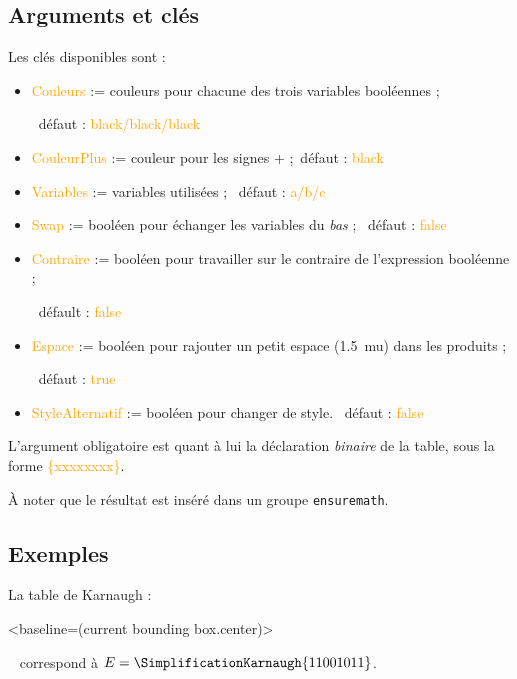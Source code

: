 \documentclass[french,a4paper,11pt]{article}
\newcommand\Cle[1]{{\small\sffamily\textlangle \textcolor{orange}{#1}\textrangle}}
\begin{document}
{{\pagebreak

\subsection{Arguments et clés }

\begin{DemoCode}
\end{DemoCode}

\begin{tipblock}
Les clés disponibles sont :

\begin{itemize}
	\item \Cle{Couleurs} := couleurs pour chacune des trois variables booléennes ;
	
	\hfill~défaut : \Cle{black/black/black}
	\item \Cle{CouleurPlus} := couleur pour les signes + ;\hfill~défaut : \Cle{black}
	\item \Cle{Variables} := variables utilisées ; \hfill~défaut : \Cle{a/b/c}
	\item \Cle{Swap} := booléen pour échanger les variables du \textit{bas} ; \hfill~défaut : \Cle{false}
	\item \Cle{Contraire} := booléen pour travailler sur le contraire de l'expression booléenne ;
	
	\hfill~défault : \Cle{false}
	\item \Cle{Espace} := booléen pour rajouter un petit espace (1.5~mu) dans les produits ;
	
	\hfill~défaut : \Cle{true}
	\item \Cle{StyleAlternatif} := booléen pour changer de style. \hfill~défaut : \Cle{false}
\end{itemize}

L'argument obligatoire est quant à lui la déclaration \textit{binaire} de la table, sous la forme \Cle{\{xxxxxxxx\}}.

\smallskip

À noter que le résultat est inséré dans un groupe \texttt{ensuremath}.
\end{tipblock}

\subsection{Exemples}

\begin{DemoCode}
La table de Karnaugh :
\begin{TableKarnaugh}<baseline=(current bounding box.center)>
\end{TableKarnaugh}~
correspond à $E=\SimplificationKarnaugh{11001011}$.
\end{DemoCode}

}}
\end{document}
